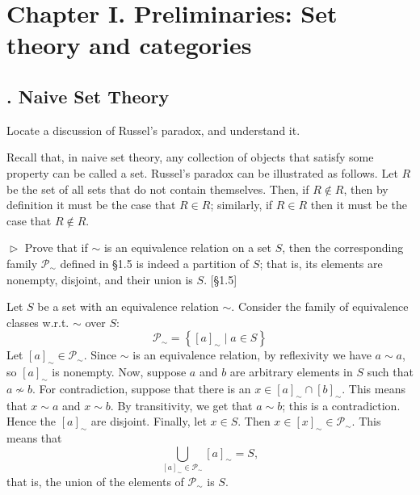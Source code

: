\section{Chapter I.\hspace{0.2em} Preliminaries: Set theory and categories}

\subsection{. Naive Set Theory}

\begin{problem}[1.1]
	Locate a discussion of Russel's paradox, and understand it.
\end{problem}
\begin{solution}
	Recall that, in naive set theory, any collection of objects
	that satisfy some property can be called a set. Russel's paradox can be
	illustrated as follows.  Let $R$ be the set of all sets that do not contain
	themselves. Then, if $R\notin R$, then by definition it must be the case that
	$R\in R$; similarly, if $R\in R$ then it must be the case that $R\notin R$.
\end{solution}

\hypertarget{Exercise I.1.2}{}
\begin{problem}[1.2]
	$\vartriangleright$ Prove that if $\sim$ is an equivalence relation on a set $S$, then
	the corresponding family $\mathscr{P}_{\sim}$ defined in \S1.5 is indeed a
	partition of $S$; that is, its elements are nonempty, disjoint, and their union
	is $S$. [\S1.5]
\end{problem}

\begin{solution}
	Let $S$ be a set with an equivalence relation $\sim$.
	Consider the family of equivalence classes w.r.t. $\sim$ over $S$:
	\[ 
	\mathscr{P}_{\sim} = \left\{[a]_{\sim} \mid a\in S\right\} 
	\]
	Let $[a]_{\sim}\in\mathscr{P}_{\sim}$. Since $\sim$ is an equivalence relation,
	by reflexivity we have $a\sim a$, so $[a]_{\sim}$ is nonempty. Now, suppose
	$a$ and $b$ are arbitrary elements in $S$ such that $a\not\sim b$. For
	contradiction, suppose that there is an $x\in [a]_{\sim}\cap[b]_{\sim}$. This
	means that $x\sim a$ and $x\sim b$. By transitivity, we get that $a\sim b$; this
	is a contradiction. Hence the $[a]_{\sim}$ are disjoint. Finally, let $x\in S$.
	Then $x\in[x]_{\sim}\in \mathscr{P}_{\sim}$. This means that
	\[ \bigcup_{[a]_{\sim} \in \mathscr{P}_{\sim}} [a]_{\sim} = S, \]
	that is, the union of the elements of $\mathscr{P}_{\sim}$ is $S$.
\end{solution}

